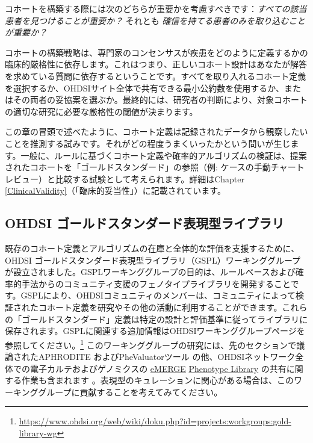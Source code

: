 \documentclass[
  11pt]{book}
\theoremstyle{definition}
\theoremstyle{definition}
\theoremstyle{definition}
\theoremstyle{definition}
\theoremstyle{remark}
\begin{document}
コホートを構築する際には次のどちらが重要かを考慮すべきです：\emph{すべての該当患者を見つけることが重要か？} それとも \emph{確信を持てる患者のみを取り込むことが重要か？}

コホートの構築戦略は、専門家のコンセンサスが疾患をどのように定義するかの臨床的厳格性に依存します。これはつまり、正しいコホート設計はあなたが解答を求めている質問に依存するということです。すべてを取り入れるコホート定義を選択するか、OHDSIサイト全体で共有できる最小公約数を使用するか、またはその両者の妥協案を選ぶか。最終的には、研究者の判断により、対象コホートの適切な研究に必要な厳格性の閾値が決まります。

この章の冒頭で述べたように、コホート定義は記録されたデータから観察したいことを推測する試みです。それがどの程度うまくいったかという問いが生じます。一般に、ルールに基づくコホート定義や確率的アルゴリズムの検証は、提案されたコホートを「ゴールドスタンダード」の参照（例: ケースの手動チャートレビュー）と比較する試験として考えられます。詳細はChapter \ref{ClinicalValidity}（「臨床的妥当性」）に記載されています。

\subsection{OHDSI ゴールドスタンダード表現型ライブラリ}\label{ohdsi-ux30b4ux30fcux30ebux30c9ux30b9ux30bfux30f3ux30c0ux30fcux30c9ux8868ux73feux578bux30e9ux30a4ux30d6ux30e9ux30ea}

既存のコホート定義とアルゴリズムの在庫と全体的な評価を支援するために、OHDSI ゴールドスタンダード表現型ライブラリ（GSPL）ワーキンググループが設立されました。GSPLワーキンググループの目的は、ルールベースおよび確率的手法からのコミュニティ支援のフェノタイプライブラリを開発することです。GSPLにより、OHDSIコミュニティのメンバーは、コミュニティによって検証されたコホート定義を研究やその他の活動に利用することができます。これらの「ゴールドスタンダード」定義は特定の設計と評価基準に従ってライブラリに保存されます。GSPLに関連する追加情報はOHDSIワーキンググループページを参照してください。\footnote{\url{https://www.ohdsi.org/web/wiki/doku.php?id=projects:workgroups:gold-library-wg}} このワーキンググループの研究には、先のセクションで議論されたAPHRODITE \citep{Banda2017APHRODITE} およびPheValuatorツール \citep{Swerdel2019phevaluator} の他、OHDSIネットワーク全体での電子カルテおよびゲノミクスの \href{https://emerge.mc.vanderbilt.edu/}{eMERGE} \href{https://phekb.org/phenotypes}{Phenotype Library} の共有に関する作業も含まれます \citep{Hripcsak2019eMERGE}。表現型のキュレーションに関心がある場合は、このワーキンググループに貢献することを考えてみてください。 
\end{document}
